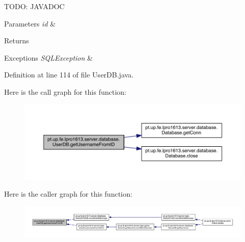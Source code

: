 T\+O\+DO\+: J\+A\+V\+A\+D\+OC 
\begin{DoxyParams}{Parameters}
{\em id} & \\
\hline
\end{DoxyParams}
\begin{DoxyReturn}{Returns}

\end{DoxyReturn}

\begin{DoxyExceptions}{Exceptions}
{\em S\+Q\+L\+Exception} & \\
\hline
\end{DoxyExceptions}


Definition at line 114 of file User\+D\+B.\+java.

Here is the call graph for this function\+:
\nopagebreak
\begin{figure}[H]
\begin{center}
\leavevmode
\includegraphics[width=350pt]{classpt_1_1up_1_1fe_1_1lpro1613_1_1server_1_1database_1_1_user_d_b_ab5c986eb5c2ba36eef3defee599c6903_cgraph}
\end{center}
\end{figure}
Here is the caller graph for this function\+:
\nopagebreak
\begin{figure}[H]
\begin{center}
\leavevmode
\includegraphics[width=350pt]{classpt_1_1up_1_1fe_1_1lpro1613_1_1server_1_1database_1_1_user_d_b_ab5c986eb5c2ba36eef3defee599c6903_icgraph}
\end{center}
\end{figure}
\hypertarget{classpt_1_1up_1_1fe_1_1lpro1613_1_1server_1_1database_1_1_user_d_b_ab6501b54b7768d7d854a68dd9ed1b830}{}\label{classpt_1_1up_1_1fe_1_1lpro1613_1_1server_1_1database_1_1_user_d_b_ab6501b54b7768d7d854a68dd9ed1b830} 
